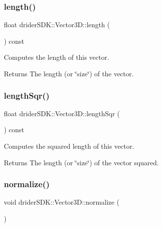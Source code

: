 \subsubsection{\texorpdfstring{length()}{length()}}
{\footnotesize\ttfamily float drider\+S\+D\+K\+::\+Vector3\+D\+::length (\begin{DoxyParamCaption}{ }\end{DoxyParamCaption}) const}

Computes the length of this vector.

\begin{DoxyReturn}{Returns}
The length (or \char`\"{}size\char`\"{}) of the vector. 
\end{DoxyReturn}
\mbox{\label{classdrider_s_d_k_1_1_vector3_d_a95efa15ddb5b55ab4278dc45e1da88e1}} 
\subsubsection{\texorpdfstring{length\+Sqr()}{lengthSqr()}}
{\footnotesize\ttfamily float drider\+S\+D\+K\+::\+Vector3\+D\+::length\+Sqr (\begin{DoxyParamCaption}{ }\end{DoxyParamCaption}) const}

Computes the squared length of this vector.

\begin{DoxyReturn}{Returns}
The length (or \char`\"{}size\char`\"{}) of the vector squared. 
\end{DoxyReturn}
\mbox{\label{classdrider_s_d_k_1_1_vector3_d_afcec7f0ed8e1b080c1cdaf3d0cedac5c}} 
\subsubsection{\texorpdfstring{normalize()}{normalize()}}
{\footnotesize\ttfamily void drider\+S\+D\+K\+::\+Vector3\+D\+::normalize (\begin{DoxyParamCaption}{ }\end{DoxyParamCaption})}

